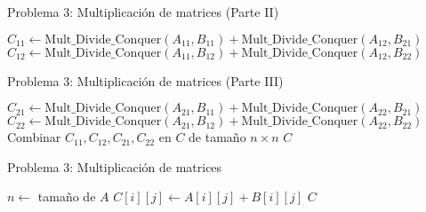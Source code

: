 \documentclass{beamer}
\begin{document}
\begin{frame}{Problema 3: Multiplicación de matrices (Parte II)}
\scriptsize
\begin{algorithm}[H]
\caption{Multiplicación de matrices por divide y vencerás (cont.)}
\begin{algorithmic}[1]
  \State $C_{11} \gets \text{Mult\_Divide\_Conquer}(A_{11}, B_{11}) + \text{Mult\_Divide\_Conquer}(A_{12}, B_{21})$
  \State $C_{12} \gets \text{Mult\_Divide\_Conquer}(A_{11}, B_{12}) + \text{Mult\_Divide\_Conquer}(A_{12}, B_{22})$ 
\end{algorithmic}
\end{algorithm}
\end{frame}

\begin{frame}{Problema 3: Multiplicación de matrices (Parte III)}
\scriptsize
\begin{algorithm}[H]
\caption{Multiplicación de matrices por divide y vencerás (cont.)}
\begin{algorithmic}[1]
    
    \State $C_{21} \gets \text{Mult\_Divide\_Conquer}(A_{21}, B_{11}) + \text{Mult\_Divide\_Conquer}(A_{22}, B_{21})$
    \State $C_{22} \gets \text{Mult\_Divide\_Conquer}(A_{21}, B_{12}) + \text{Mult\_Divide\_Conquer}(A_{22}, B_{22})$
    \State Combinar $C_{11}, C_{12}, C_{21}, C_{22}$ en $C$ de tamaño $n \times n$
    \State \Return $C$
  \EndFunction
\end{algorithmic}
\end{algorithm}
\end{frame}



\begin{frame}{Problema 3: Multiplicación de matrices}
\begin{algorithm}[H]
\caption{Multiplicación de matrices por divide y vencerás(Parte II)}
\begin{algorithmic}[1]
  \State $n \gets$ tamaño de $A$
      \State $C[i][j] \gets A[i][j] + B[i][j]$
    \EndFor
  \EndFor
  \State \Return $C$
\EndFunction

\end{algorithmic}
\end{algorithm}
\end{frame}
\end{document}
